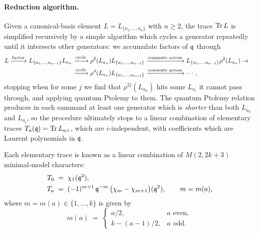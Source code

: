 \documentclass[12pt]{amsart}
\begin{document}
\paragraph{Reduction algorithm.}
Given a canonical-basis element $L = L_{\{a_1, \ldots, a_n\}}$ with $n \ge 2$, the trace 
$\operatorname{Tr} L$ is simplified recursively by a simple algorithm which cycles a generator repeatedly until 
it intersects other generators: we accumulate factors of $\mathfrak{q}$ through 
\begin{align}
L \xrightarrow{\text{factor}} L_{\{a_1, \ldots, a_{n-1}\}} L_{a_n} &\xrightarrow{\text{cycle}}  \rho^2(L_{a_n}) L_{\{a_1, \ldots, a_{n-1}\}} \xrightarrow{\text{commute across}} L_{\{a_1, \ldots, a_{n-1}\}}  \rho^2(L_{a_n}) \to \cr &\xrightarrow{\text{cycle}}  \rho^4(L_{a_n})L_{\{a_1, \ldots, a_{n-1}\}}\xrightarrow{\text{commute across}} \cdots \, ,
\end{align}
stopping when for some $j$ we find that $\rho^{2j}(L_{a_n})$ hits some $L_{a_i}$ it cannot pass through, and applying quantum Ptolemy to them. The quantum Ptolemy 
relation produces in each summand at least one generator which is {\it shorter} than both $L_{a_n}$ and $L_{a_i}$, so the procedure ultimately stops 
to a linear combination of elementary traces $T_a(\mathfrak{q}) = \operatorname{Tr} L_{a;i}$, which are $i$-independent, with coefficients which are Laurent polynomials in $\mathfrak{q}$. 

Each elementary trace is known as a linear combination of $M(2, 2k{+}3)$ minimal-model characters:
\begin{align}
  T_0 \;&=\; \chi_1(\mathfrak{q}^2), \\
  T_a \;&=\; (-1)^{m+1}\, \mathfrak{q}^{-m}\, \bigl(\chi_m - \chi_{m+1}\bigr)(\mathfrak{q}^2),
        \qquad m = m(a),
\end{align}
where $m = m(a) \in \{1, \ldots, k\}$ is given by
\begin{equation}
  m(a) \;=\;
    \begin{cases}
      a/2, & a \text{ even}, \\
      k - (a-1)/2, & a \text{ odd}.
    \end{cases}
\end{equation}
\end{document}
